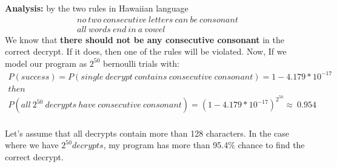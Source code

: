 \documentclass[12pt,letterpaper]{article}
\begin{document}
    \textbf{Analysis:} by the two rules in Hawaiian language
    \begin{align*}
       no \ two \  consecutive \ letters\ can \ be \ consonant \\
       all \ words \ end \ in \ a \ vowel
    \end{align*}
    We know that \textbf{there should not be any consecutive consonant} in the correct decrypt. If it does, then one of the rules will be violated.  Now, If we model our program as $2^{50}$ bernoulli trials with:
    \begin{align*}
      P(success) = P(single \ decrypt \ contains \ consecutive \  consonant) = 1 - 4.179*10^{-17} \\
      then \\
      P(all \ 2^{50}  \ decrypts \ have \ consecutive \ consonant) = (1 - 4.179*10^{-17})^{2^{50}} \approx \ 0.954
    \end{align*}
    \\
    Let's assume that all decrypts contain more than 128 characters. In the case where we have $2^{50} decrypts$, my program has more than 95.4\% chance to find the correct decrypt.
    
\end{document}
